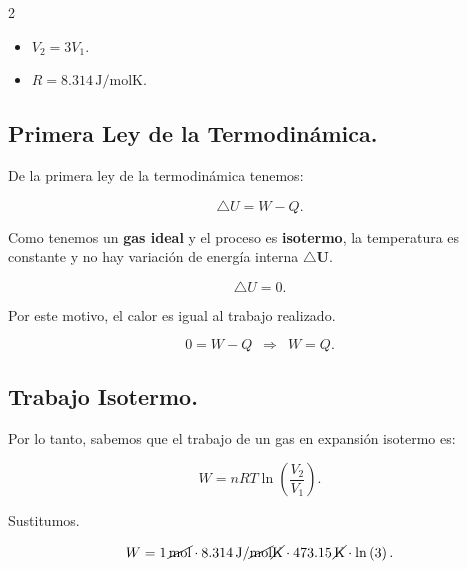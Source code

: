 \documentclass[a4paper,12pt]{article} %
\begin{document}
\begin{multicols}{2}
    \begin{itemize}
        \item \( V_2 = 3V_1. \)
        \item \( R = 8.314 \, \mathrm{J}/\mathrm{mol}\mathrm{K}. \)
    \end{itemize}
\end{multicols}

\vspace{\baselineskip}

\subsection{Primera Ley de la Termodinámica.}

\begin{justify}
    De la primera ley de la termodinámica tenemos:
\end{justify}

\[ \triangle U = W - Q. \]

\begin{justify}
    Como tenemos un \textbf{gas ideal} y el proceso es \textbf{isotermo}, la temperatura es constante y no hay variación de energía interna \( \mathbf{\triangle U}\).
\end{justify}

\[ \triangle U = 0. \]

\begin{justify}
    Por este motivo, el calor es igual al trabajo realizado.
\end{justify}

\[ 0 = W - Q \, \, \, \Rightarrow \, \, \, W = Q . \]

\vspace{\baselineskip}

\subsection{Trabajo Isotermo.}

\begin{justify}
    Por lo tanto, sabemos que el trabajo de un gas en expansión isotermo es:
\end{justify}

\[ W = nRT \ln \left( \frac{V_2}{V_1} \right). \]

\begin{justify}
    Sustitumos.
\end{justify}

\[ W = 1 \, \cancel{\mathrm{mol}} \cdot 8.314 \, \mathrm{J} / \cancel{\mathrm{mol}} \cancel{\mathrm{K}} \cdot 473.15 \, \cancel{\mathrm{K}} \cdot \ln \left( 3 \right).  \]
\end{document}
